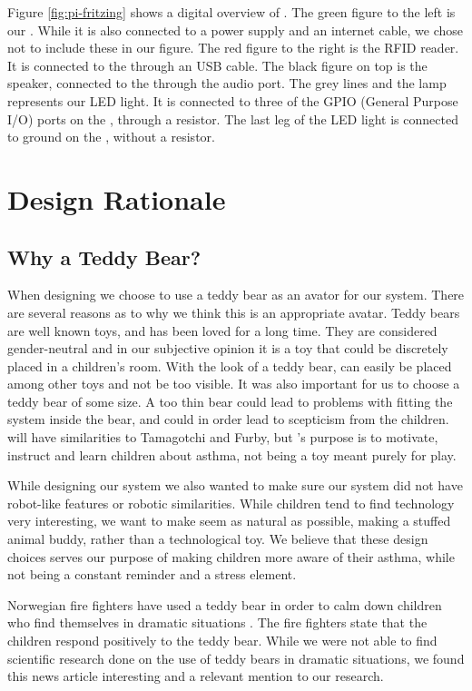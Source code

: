 Figure \ref{fig:pi-fritzing} shows a digital overview of \buddy{}. The green figure to the left is our \rpi{}. While it is also connected to a power supply and an internet cable, we chose not to include these in our figure. The red figure to the right is the RFID reader. It is connected to the \rpi{} through an USB cable. The black figure on top is the speaker, connected to the \rpi{} through the audio port. 
The grey lines and the lamp represents our LED light. It is connected to three of the GPIO (General Purpose I/O) ports on the \rpi{}, through a resistor. The last leg of the LED light is connected to ground on the \rpi{}, without a resistor.

\section{Design Rationale}
\subsection{Why a Teddy Bear?}
When designing \buddy{} we choose to use a teddy bear as an avator for our system. There are several reasons as to why we think this is an appropriate avatar. Teddy bears are well known toys, and has been loved for a long time. They are considered gender-neutral\cite{stagnitti1997determining}\cite{cherney2006gender} and in our subjective opinion it is a toy that could be discretely placed in a children's room. With the look of a teddy bear, \buddy{} can easily be placed among other toys and not be too visible. It was also important for us to choose a teddy bear of some size. A too thin bear could lead to problems with fitting the system inside the bear, and could in order lead to scepticism from the children. \buddy{} will have similarities to Tamagotchi\cite{tamagotchi} and Furby\cite{furby}, but \buddy{}'s purpose is to motivate, instruct and learn children about asthma, not being a toy meant purely for play. 

While designing our system we also wanted to make sure our system did not have robot-like features or robotic similarities. While children tend to find technology very interesting, we want to make \buddy{} seem as natural as possible, making a stuffed animal buddy, rather than a technological toy. We believe that these design choices serves our purpose of making children more aware of their asthma, while not being a constant reminder and a stress element. 

Norwegian fire fighters have used a teddy bear in order to calm down children who find themselves in dramatic situations . The fire fighters state that the children respond positively to the teddy bear. 
While we were not able to find scientific research done on the use of teddy bears in dramatic situations, we found this news article interesting and a relevant mention to our research. 

